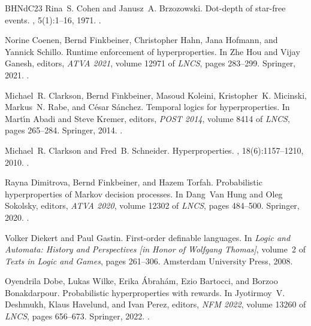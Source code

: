 \documentclass[dvipsnames,10pt,a4paper]{amsart}
\theoremstyle{definition}
\theoremstyle{remark}
\begin{document}
\begin{thebibliography}{BHNdC23}
Rina~S. Cohen and Janusz~A. Brzozowski.
\newblock Dot-depth of star-free events.
, 5(1):1--16, 1971.
\newblock \href {https://doi.org/10.1016/S0022-0000(71)80003-X} {}.

Norine Coenen, Bernd Finkbeiner, Christopher Hahn, Jana Hofmann, and Yannick Schillo.
\newblock Runtime enforcement of hyperproperties.
\newblock In Zhe Hou and Vijay Ganesh, editors, {\em {ATVA} 2021}, volume 12971 of {\em LNCS}, pages 283--299. Springer, 2021.
\newblock \href {https://doi.org/10.1007/978-3-030-88885-5\_19} {}.

Michael~R. Clarkson, Bernd Finkbeiner, Masoud Koleini, Kristopher~K. Micinski, Markus~N. Rabe, and C{\'{e}}sar S{\'{a}}nchez.
\newblock Temporal logics for hyperproperties.
\newblock In Mart{\'{\i}}n Abadi and Steve Kremer, editors, {\em {POST} 2014}, volume 8414 of {\em LNCS}, pages 265--284. Springer, 2014.
\newblock \href {https://doi.org/10.1007/978-3-642-54792-8\_15} {}.

Michael~R. Clarkson and Fred~B. Schneider.
\newblock Hyperproperties.
, 18(6):1157--1210, 2010.
\newblock \href {https://doi.org/10.3233/JCS-2009-0393} {}.

Rayna Dimitrova, Bernd Finkbeiner, and Hazem Torfah.
\newblock Probabilistic hyperproperties of {M}arkov decision processes.
\newblock In Dang~Van Hung and Oleg Sokolsky, editors, {\em {ATVA} 2020}, volume 12302 of {\em LNCS}, pages 484--500. Springer, 2020.
\newblock \href {https://doi.org/10.1007/978-3-030-59152-6\_27} {}.

Volker Diekert and Paul Gastin.
\newblock First-order definable languages.
\newblock In {\em Logic and Automata: History and Perspectives [in Honor of Wolfgang Thomas]}, volume~2 of {\em Texts in Logic and Games}, pages 261--306. Amsterdam University Press, 2008.

Oyendrila Dobe, Lukas Wilke, Erika {\'{A}}brah{\'{a}}m, Ezio Bartocci, and Borzoo Bonakdarpour.
\newblock Probabilistic hyperproperties with rewards.
\newblock In Jyotirmoy~V. Deshmukh, Klaus Havelund, and Ivan Perez, editors, {\em {NFM} 2022}, volume 13260 of {\em LNCS}, pages 656--673. Springer, 2022.
\newblock \href {https://doi.org/10.1007/978-3-031-06773-0\_35} {}.


\end{thebibliography}
\end{document}
